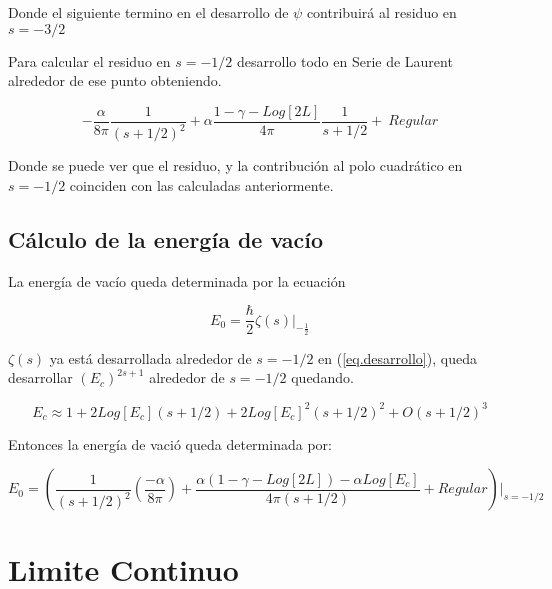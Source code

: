 Donde el siguiente termino en el desarrollo de $ \psi $ contribuirá al residuo en $s = -3/2$

Para calcular el residuo en $s=-1/2$ desarrollo todo en Serie de Laurent alrededor de ese punto obteniendo.

\begin{equation}
    - \frac{\alpha}{8 \pi} \frac{1}{(s+1/2)^2} + 
    \alpha \frac{1-\gamma -Log[2 L]}{4 \pi} \frac{1}{s+1/2} + \ Regular
\label{eq.desarrollo}
\end{equation}

Donde se puede ver que el residuo, y la contribución al polo cuadrático en $s=-1/2$ coinciden con las calculadas anteriormente.


\section{Cálculo de la energía de vacío}

La energía de vacío queda determinada por la ecuación 

\begin{equation}
    E _0 = \frac{\hbar}{2}  
    \zeta (s)  |  _{- \frac{1}{2}}
\end{equation}

$\zeta (s)$ ya está desarrollada alrededor de $s=-1/2$ en (\ref{eq.desarrollo}), queda desarrollar $(E_c) ^{2s+1} $ alrededor de $s=-1/2$ quedando.

\begin{equation}
    E _c \approx 
    1 + 2 Log[E_c] (s + 1/2) +
    2 Log[E_c] ^2 (s+1/2) ^2 + 
    O (s+1/2)^3
\end{equation}

Entonces la energía de vació queda determinada por:

\begin{equation}
    E _0 =
    \left(
    \frac{1}{(s+1/2)^2} 
    \left(
    \frac{- \alpha}{8 \pi}
    \right)+
    \frac{
    \alpha(1 -\gamma-Log[2L]) - 
    \alpha Log[E_c] 
    }{4 \pi (s+1/2)} 
     + Regular
    \right) | _{s=-1/2}
\end{equation}


\chapter{Limite Continuo}

